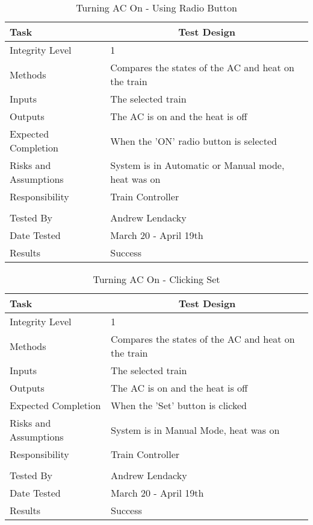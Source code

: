 \documentclass[]{article}
\begin{document}
\begin{table}[H]
	\centering
	\caption{Turning AC On - Using Radio Button}
	\begin{tabular}{|l|l|}
		\hline
		Task & \multicolumn{1}{c|}{Test Design} \\ \hline
		Integrity Level & 1 \\ \hline
		Methods & Compares the states of the AC and heat on the train\\ \hline
		Inputs & The selected train\\ \hline
		Outputs & The AC is on and the heat is off \\ \hline
		Expected Completion & When the 'ON' radio button is selected\\ \hline
		Risks and Assumptions & System is in Automatic or Manual mode, heat was on \\ \hline
		Responsibility & Train Controller\\ \hline
			\\ \hline
		Tested By   &  Andrew Lendacky\\	\hline
		Date Tested & \parbox[t]{10cm}{March 20 - April 19th}\\ \hline
		Results & Success\\ \hline
	\end{tabular}
\end{table}

\begin{table}[H]
	\centering
	\caption{Turning AC On - Clicking Set}
	\begin{tabular}{|l|l|}
		\hline
		Task & \multicolumn{1}{c|}{Test Design} \\ \hline
		Integrity Level & 1 \\ \hline
		Methods & Compares the states of the AC and heat on the train\\ \hline
		Inputs & The selected train\\ \hline
		Outputs & The AC is on and the heat is off \\ \hline
		Expected Completion & When the 'Set' button is clicked\\ \hline
		Risks and Assumptions & System is in Manual Mode, heat was on \\ \hline
		Responsibility &  Train Controller\\ \hline
			\\ \hline
		Tested By   &  Andrew Lendacky\\	\hline
		Date Tested & \parbox[t]{10cm}{March 20 - April 19th}\\ \hline
		Results & Success\\ \hline
	\end{tabular}
\end{table}
\end{document}
